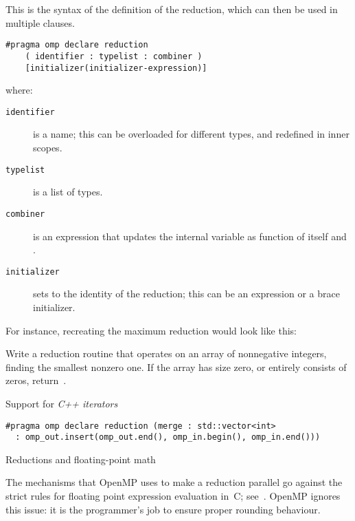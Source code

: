 This is the syntax of the definition of the reduction, which can then
be used in multiple  clauses.
\begin{lstlisting}
#pragma omp declare reduction 
    ( identifier : typelist : combiner )
    [initializer(initializer-expression)]
\end{lstlisting}
where:
\begin{description}
  \item[\texttt{identifier}] is a name; this can be overloaded for
    different types, and redefined in inner scopes.
  \item[\texttt{typelist}] is a list of types.
  \item[\texttt{combiner}] is an expression that updates the internal
    variable  as function of itself and .
  \item[\texttt{initializer}] sets  to the
    identity of the reduction; this
    can be an expression or a brace initializer.
\end{description}

For instance, recreating the maximum reduction would look like this:
%

\begin{exercise}
  Write a reduction routine that operates on an array of nonnegative
  integers, finding the smallest nonzero one. If the array has size
  zero, or entirely consists of zeros, return~.
\end{exercise}

Support for
\emph{C++ iterators}
\begin{lstlisting}
#pragma omp declare reduction (merge : std::vector<int>
  : omp_out.insert(omp_out.end(), omp_in.begin(), omp_in.end())) 
\end{lstlisting}


 {Reductions and floating-point math}

The mechanisms that OpenMP uses to make a reduction parallel go
against the strict rules for floating point expression evaluation in~C;
see~. OpenMP ignores this issue: it is the
programmer's job to ensure proper rounding behaviour.

